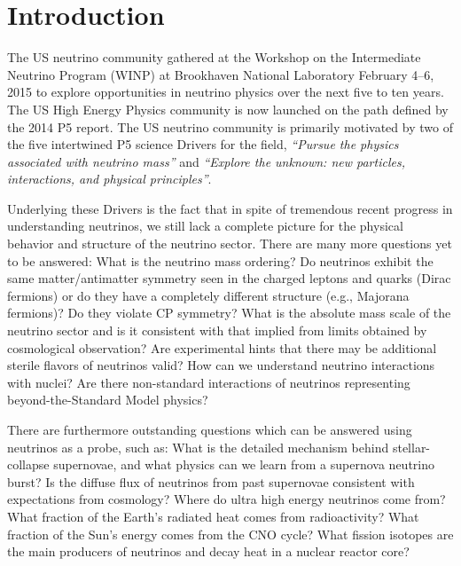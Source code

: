 \section{Introduction}
\label{sec:Introduction}


The US neutrino community gathered at the Workshop on the Intermediate
Neutrino Program (WINP) at Brookhaven National Laboratory February
4--6, 2015 to explore opportunities in neutrino physics over the next
five to ten years.  The US High Energy Physics community is now
launched on the path defined by the 2014 P5 report.  The US neutrino
community is primarily motivated by two of the five intertwined P5
science Drivers for the field, \textit{``Pursue the physics associated
  with neutrino mass''} and \textit{``Explore the unknown: new
  particles, interactions, and physical principles''}.

Underlying these Drivers is the fact that in spite of tremendous
recent progress in understanding neutrinos, we still lack a complete
picture for the physical behavior and structure of the
neutrino sector. There are many more questions yet to be answered:
What is the neutrino mass ordering? Do neutrinos exhibit the same
matter/antimatter symmetry seen in the charged leptons and quarks
(Dirac fermions) or do they have a completely different structure
(e.g., Majorana fermions)?  Do they violate CP symmetry?  What is the
absolute mass scale of the neutrino sector and is it consistent with
that implied from limits obtained by cosmological observation? Are
experimental hints that there may be additional sterile flavors of
neutrinos valid?  How can we understand neutrino interactions with
nuclei?  Are there non-standard interactions of neutrinos representing
beyond-the-Standard Model physics? 

There are furthermore outstanding questions which can be answered
using neutrinos as a probe, such as: What is the detailed mechanism
behind stellar-collapse supernovae, and what physics can we learn from
a supernova neutrino burst? Is the diffuse flux of neutrinos from past
supernovae consistent with expectations from cosmology?  Where do
ultra high energy neutrinos come from?  What fraction of the Earth's
radiated heat comes from radioactivity?  What fraction of the Sun's
energy comes from the CNO cycle?  What fission isotopes are the main
producers of neutrinos and decay heat in a nuclear reactor core?

